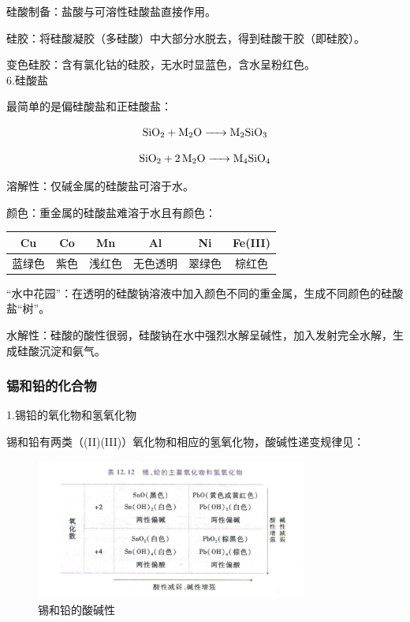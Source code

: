 \documentclass[a4paper,UTF8]{article}
\begin{document}
硅酸制备：盐酸与可溶性硅酸盐直接作用。

硅胶：将硅酸凝胶（多硅酸）中大部分水脱去，得到硅酸干胶（即硅胶）。

变色硅胶：含有氯化钴的硅胶，无水时显蓝色，含水呈粉红色。\\

6.硅酸盐

最简单的是偏硅酸盐和正硅酸盐：

$$ \ce{SiO2 + M2O -> M2SiO3} $$

$$ \ce{SiO2 + 2M2O -> M4SiO4} $$

溶解性：仅碱金属的硅酸盐可溶于水。

颜色：重金属的硅酸盐难溶于水且有颜色：

\begin{tabular}{c|c|c|c|c|c}

	Cu&Co&Mn&Al&Ni&Fe(III)\\ \hline
	蓝绿色&紫色&浅红色&无色透明&翠绿色&棕红色\\

\end{tabular}

“水中花园”：在透明的硅酸钠溶液中加入颜色不同的重金属，生成不同颜色的硅酸盐“树”。

水解性：硅酸的酸性很弱，硅酸钠在水中强烈水解呈碱性，加入发射完全水解，生成硅酸沉淀和氨气。

\subsubsection{锡和铅的化合物}

1.锡铅的氧化物和氢氧化物

锡和铅有两类（(II)(III)）氧化物和相应的氢氧化物，酸碱性递变规律见：

\begin{figure}[htpb]
	\centering
	\includegraphics[width=0.8\textwidth]{figure//锡和铅的酸碱性.png}
	\caption{锡和铅的酸碱性}
	\label{fig:}
\end{figure}
\end{document}
